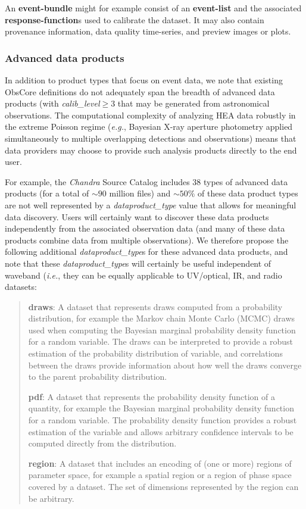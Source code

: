 \documentclass[11pt,a4paper]{ivoa}
\begin{document}
An {\bf event-bundle} might for example consist of an {\bf event-list} and the associated {\bf response-function}s used to calibrate the dataset. It may also contain provenance information, data quality time-series, and preview images or plots.

\subsubsection{Advanced data products}

In addition to product types that focus on event data, we note that existing ObsCore definitions do not adequately span the breadth of advanced data products (with {\em calib\_level\/}${}\ge 3$ that may be generated from astronomical observations. The computational complexity of analyzing \gls{HEA} data robustly in the extreme Poisson regime ({\em e.g.\/}, Bayesian X-ray aperture photometry applied simultaneously to multiple overlapping detections and observations) means that data providers may choose to provide such analysis products directly to the end user.

For example, the {\em Chandra\/} Source Catalog includes 38 types of advanced data products  (for a total of $\sim\!90$ million files) and $\sim\!50\%$ of these data product types are not well represented by a {\em dataproduct\_type} value that allows for meaningful data discovery.  Users will certainly want to discover these data products independently from the associated observation data (and many of these data products combine data from multiple observations).  We therefore propose the following additional {\em dataproduct\_type}s for these advanced data products, and note that these {\em dataproduct\_type}s will certainly be useful independent of waveband ({\em i.e.\/}, they can be equally applicable to UV/optical, IR, and radio datasets:

\begin{quote}
{\bf draws}:  A dataset that represents draws computed from a probability distribution, for example the Markov chain Monte Carlo (MCMC) draws used when computing the Bayesian marginal probability density function for a random variable.  The draws can be interpreted to provide a robust estimation of the probability distribution of variable, and correlations between the draws provide information about how well the draws converge to the parent probability distribution.

{\bf pdf}: A dataset that represents the probability density function of a quantity, for example the Bayesian marginal probability density function for a random variable.  The probability density function provides a robust estimation of the variable and allows arbitrary confidence intervals to be computed directly from the distribution.

{\bf region}: A dataset that includes an encoding of (one or more) regions of parameter space, for example a spatial region or a region of phase space covered by a dataset.  The set of dimensions represented by the region can be arbitrary.
\end{quote}
\end{document}
